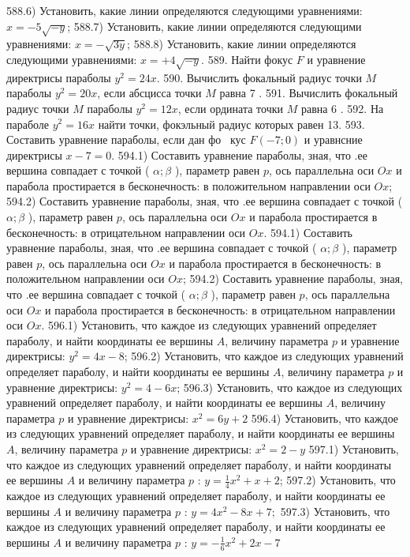 588.6) Установить, какие линии определяются следующими уравнениями: $x=-5 \sqrt{-y}$;
588.7) Установить, какие линии определяются следующими уравнениями: $x=-\sqrt{3 y}$;
588.8) Установить, какие линии определяются следующими уравнениями: $x=+4 \sqrt{-y}$.
589. Найти фокус $F$ и уравнение директрисы параболы $y^2=24 x$.
590. Вычислить фокальный радиус точки $M$ параболы $y^2=20 x$, если абсцисса точки $M$ равна 7 .
591. Вычислить фокальный радиус точки $M$ параболы $y^2=12 x$, если ордината точки $M$ равна 6 .
592. На параболе $y^2=16 x$ найти точки, фокэльный радиус которых равен 13.
593. Составить уравнение параболы, если дан фо~ кус $F(-7 ; 0)$ и уравнсние директрисы $x-7=0$.
594.1) Составить уравнение параболы, зная, что .ее вершина совпадает с точкой ( $\alpha ; \beta$ ), параметр равен $p$, ось параллельна оси $O x$ и парабола простирается в бесконечность: в положительном направлении оси $O x$;
594.2) Составить уравнение параболы, зная, что .ее вершина совпадает с точкой ( $\alpha ; \beta$ ), параметр равен $p$, ось параллельна оси $O x$ и парабола простирается в бесконечность: в отрицательном направлении оси $O x$.
594.1) Составить уравнение параболы, зная, что .ее вершина совпадает с точкой ( $\alpha ; \beta$ ), параметр равен $p$, ось параллельна оси $O x$ и парабола простирается в бесконечность: в положительном направлении оси $O x$;
594.2) Составить уравнение параболы, зная, что .ее вершина совпадает с точкой ( $\alpha ; \beta$ ), параметр равен $p$, ось параллельна оси $O x$ и парабола простирается в бесконечность: в отрицательном направлении оси $O x$.
596.1) Установить, что каждое из следующих уравнений определяет параболу, и найти координаты ее вершины $A$, величину параметра $p$ и уравнение директрисы: $y^2=4 x-8$;
596.2) Установить, что каждое из следующих уравнений определяет параболу, и найти координаты ее вершины $A$, величину параметра $p$ и уравнение директрисы: $y^2=4-6 x$;
596.3) Установить, что каждое из следующих уравнений определяет параболу, и найти координаты ее вершины $A$, величину параметра $p$ и уравнение директрисы: $x^2=6 y+2$
596.4) Установить, что каждое из следующих уравнений определяет параболу, и найти координаты ее вершины $A$, величину параметра $p$ и уравнение директрисы: $x^2=2-y$
597.1) Установить, что каждое из следующих уравнений определяет параболу, и найти координаты ее вершины $A$ и величину параметра $p$ : $y=\frac{1}{4} x^2+x+2$; 
597.2) Установить, что каждое из следующих уравнений определяет параболу, и найти координаты ее вершины $A$ и величину параметра $p$ : $y=4 x^2-8 x+7 ;$ 
597.3) Установить, что каждое из следующих уравнений определяет параболу, и найти координаты ее вершины $A$ и величину параметра $p$ : $y=-\frac{1}{6} x^2+2 x-7$
